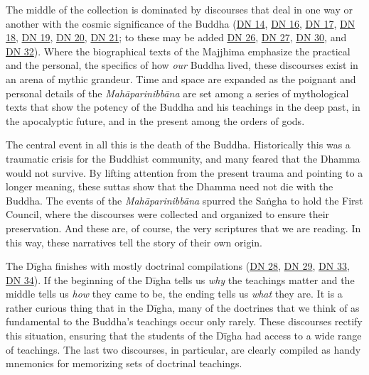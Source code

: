 \documentclass[12pt,openany]{book}%
\begin{document}
The middle of the collection is dominated by discourses that deal in one way or another with the cosmic significance of the Buddha (\href{https://suttacentral.net/dn14}{DN 14}, \href{https://suttacentral.net/dn16}{DN 16}, \href{https://suttacentral.net/dn17}{DN 17}, \href{https://suttacentral.net/dn18}{DN 18}, \href{https://suttacentral.net/dn19}{DN 19}, \href{https://suttacentral.net/dn20}{DN 20}, \href{https://suttacentral.net/dn21}{DN 21}; to these may be added \href{https://suttacentral.net/dn26}{DN 26}, \href{https://suttacentral.net/dn27}{DN 27}, \href{https://suttacentral.net/dn30}{DN 30}, and \href{https://suttacentral.net/dn32}{DN 32}). Where the biographical texts of the Majjhima emphasize the practical and the personal, the specifics of how \emph{our} Buddha lived, these discourses exist in an arena of mythic grandeur. Time and space are expanded as the poignant and personal details of the \textit{\textsanskrit{Mahāparinibbāna}} are set among a series of mythological texts that show the potency of the Buddha and his teachings in the deep past, in the apocalyptic future, and in the present among the orders of gods.

The central event in all this is the death of the Buddha. Historically this was a traumatic crisis for the Buddhist community, and many feared that the Dhamma would not survive. By lifting attention from the present trauma and pointing to a longer meaning, these suttas show that the Dhamma need not die with the Buddha. The events of the \textit{\textsanskrit{Mahāparinibbāna}} spurred the \textsanskrit{Saṅgha} to hold the First Council, where the discourses were collected and organized to ensure their preservation. And these are, of course, the very scriptures that we are reading. In this way, these narratives tell the story of their own origin.

The \textsanskrit{Dīgha} finishes with mostly doctrinal compilations (\href{https://suttacentral.net/dn28}{DN 28}, \href{https://suttacentral.net/dn29}{DN 29}, \href{https://suttacentral.net/dn33}{DN 33}, \href{https://suttacentral.net/dn34}{DN 34}). If the beginning of the \textsanskrit{Dīgha} tells us \emph{why} the teachings matter and the middle tells us \emph{how} they came to be, the ending tells us \emph{what} they are. It is a rather curious thing that in the \textsanskrit{Dīgha}, many of the doctrines that we think of as fundamental to the Buddha’s teachings occur only rarely. These discourses rectify this situation, ensuring that the students of the \textsanskrit{Dīgha} had access to a wide range of teachings. The last two discourses, in particular, are clearly compiled as handy mnemonics for memorizing sets of doctrinal teachings.
\end{document}
